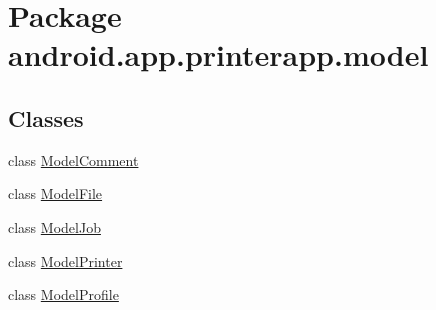 \hypertarget{namespaceandroid_1_1app_1_1printerapp_1_1model}{}\section{Package android.\+app.\+printerapp.\+model}
\label{namespaceandroid_1_1app_1_1printerapp_1_1model}
\subsection*{Classes}
\begin{DoxyCompactItemize}
\item 
class \hyperlink{classandroid_1_1app_1_1printerapp_1_1model_1_1_model_comment}{Model\+Comment}
\item 
class \hyperlink{classandroid_1_1app_1_1printerapp_1_1model_1_1_model_file}{Model\+File}
\item 
class \hyperlink{classandroid_1_1app_1_1printerapp_1_1model_1_1_model_job}{Model\+Job}
\item 
class \hyperlink{classandroid_1_1app_1_1printerapp_1_1model_1_1_model_printer}{Model\+Printer}
\item 
class \hyperlink{classandroid_1_1app_1_1printerapp_1_1model_1_1_model_profile}{Model\+Profile}
\end{DoxyCompactItemize}
